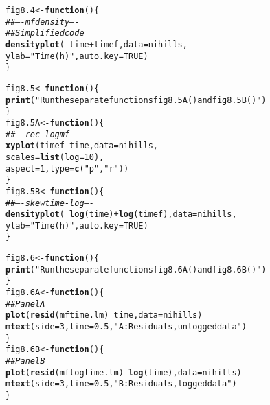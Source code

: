 \documentclass[12pt, a4paper,  BCOR=8.25mm, DIV=15]{scrartcl}\usepackage[]{graphicx}\usepackage[]{color}
\makeatletter
\newcommand{\hlnum}[1]{\textcolor[rgb]{0.686,0.059,0.569}{#1}}%
\newcommand{\hlstr}[1]{\textcolor[rgb]{0.192,0.494,0.8}{#1}}%
\newcommand{\hlcom}[1]{\textcolor[rgb]{0.678,0.584,0.686}{\textit{#1}}}%
\newcommand{\hlopt}[1]{\textcolor[rgb]{0,0,0}{#1}}%
\newcommand{\hlstd}[1]{\textcolor[rgb]{0.345,0.345,0.345}{#1}}%
\newcommand{\hlkwa}[1]{\textcolor[rgb]{0.161,0.373,0.58}{\textbf{#1}}}%
\newcommand{\hlkwb}[1]{\textcolor[rgb]{0.69,0.353,0.396}{#1}}%
\newcommand{\hlkwc}[1]{\textcolor[rgb]{0.333,0.667,0.333}{#1}}%
\newcommand{\hlkwd}[1]{\textcolor[rgb]{0.737,0.353,0.396}{\textbf{#1}}}%
\newenvironment{kframe}{%
 \def\at@end@of@kframe{}%
 \ifinner\ifhmode%
  \def\at@end@of@kframe{\end{minipage}}%
  \begin{minipage}{\columnwidth}%
 \fi\fi%
 \def\FrameCommand##1{\hskip\@totalleftmargin \hskip-\fboxsep
 \colorbox{shadecolor}{##1}\hskip-\fboxsep
     \hskip-\linewidth \hskip-\@totalleftmargin \hskip\columnwidth}%
 \MakeFramed {\advance\hsize-\width
   \@totalleftmargin\z@ \linewidth\hsize
   \@setminipage}}%
 {\par\unskip\endMakeFramed%
 \at@end@of@kframe}
\newenvironment{knitrout}{}{} %
\makeatother
\begin{document}
\begin{knitrout}
\color{fgcolor}\begin{kframe}
\begin{alltt}
\hlstd{fig8.4} \hlkwb{<-} \hlkwa{function}\hlstd{()\{}
\hlcom{## ---- mfdensity ----}
\hlcom{## Simplified code}
\hlkwd{densityplot}\hlstd{(}\hlopt{~} \hlstd{time}\hlopt{+}\hlstd{timef,} \hlkwc{data}\hlstd{=nihills,}
            \hlkwc{ylab}\hlstd{=}\hlstr{"Time (h)"}\hlstd{,} \hlkwc{auto.key}\hlstd{=}\hlnum{TRUE}\hlstd{)}
\hlstd{\}}
\end{alltt}
\end{kframe}
\end{knitrout}

\begin{knitrout}
\color{fgcolor}\begin{kframe}
\begin{alltt}
\hlstd{fig8.5} \hlkwb{<-} \hlkwa{function}\hlstd{()\{}
\hlkwd{print}\hlstd{(}\hlstr{"Run the separate functions fig8.5A() and fig8.5B()"}\hlstd{)}
\hlstd{\}}
\hlstd{fig8.5A} \hlkwb{<-} \hlkwa{function}\hlstd{()\{}
\hlcom{## ---- rec-logmf ----}
\hlkwd{xyplot}\hlstd{(timef}\hlopt{~}\hlstd{time,} \hlkwc{data}\hlstd{=nihills,}
       \hlkwc{scales}\hlstd{=}\hlkwd{list}\hlstd{(}\hlkwc{log}\hlstd{=}\hlnum{10}\hlstd{),}
       \hlkwc{aspect}\hlstd{=}\hlnum{1}\hlstd{,} \hlkwc{type}\hlstd{=}\hlkwd{c}\hlstd{(}\hlstr{"p"}\hlstd{,}\hlstr{"r"}\hlstd{))}
\hlstd{\}}
\hlstd{fig8.5B} \hlkwb{<-} \hlkwa{function}\hlstd{()\{}
\hlcom{## ---- skewtime-log ----}
\hlkwd{densityplot}\hlstd{(}\hlopt{~} \hlkwd{log}\hlstd{(time)}\hlopt{+}\hlkwd{log}\hlstd{(timef),} \hlkwc{data}\hlstd{=nihills,}
           \hlkwc{ylab}\hlstd{=}\hlstr{"Time (h)"}\hlstd{,} \hlkwc{auto.key}\hlstd{=}\hlnum{TRUE}\hlstd{)}
\hlstd{\}}
\end{alltt}
\end{kframe}
\end{knitrout}

\begin{knitrout}
\color{fgcolor}\begin{kframe}
\begin{alltt}
\hlstd{fig8.6} \hlkwb{<-} \hlkwa{function}\hlstd{()\{}
\hlkwd{print}\hlstd{(}\hlstr{"Run the separate functions fig8.6A() and fig8.6B()"}\hlstd{)}
\hlstd{\}}
\hlstd{fig8.6A} \hlkwb{<-} \hlkwa{function}\hlstd{()\{}
\hlcom{## Panel A}
\hlkwd{plot}\hlstd{(}\hlkwd{resid}\hlstd{(mftime.lm)}\hlopt{~}\hlstd{time,} \hlkwc{data}\hlstd{=nihills)}
\hlkwd{mtext}\hlstd{(}\hlkwc{side}\hlstd{=}\hlnum{3}\hlstd{,} \hlkwc{line}\hlstd{=}\hlnum{0.5}\hlstd{,} \hlstr{"A: Residuals, unlogged data"}\hlstd{)}
\hlstd{\}}
\hlstd{fig8.6B} \hlkwb{<-} \hlkwa{function}\hlstd{()\{}
\hlcom{## Panel B}
\hlkwd{plot}\hlstd{(}\hlkwd{resid}\hlstd{(mflogtime.lm)} \hlopt{~} \hlkwd{log}\hlstd{(time),} \hlkwc{data}\hlstd{=nihills)}
\hlkwd{mtext}\hlstd{(}\hlkwc{side}\hlstd{=}\hlnum{3}\hlstd{,} \hlkwc{line}\hlstd{=}\hlnum{0.5}\hlstd{,} \hlstr{"B: Residuals, logged data"}\hlstd{)}
\hlstd{\}}
\end{alltt}
\end{kframe}
\end{knitrout}
\end{document}

